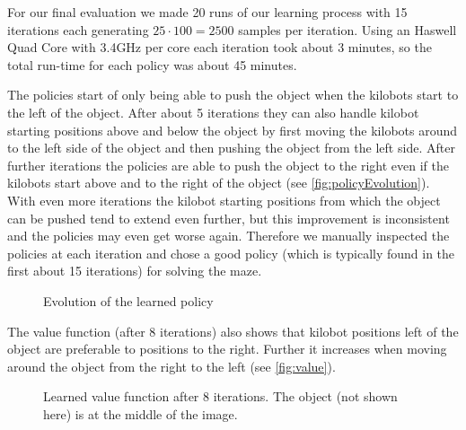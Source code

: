 \documentclass[twoside]{article}
\begin{document}
For our final evaluation we made 20 runs of our learning process with 15
iterations each generating $25 \cdot 100 = 2500$ samples per iteration. Using
an Haswell Quad Core with 3.4GHz per core each iteration took about 3 minutes,
so the total run-time for each policy was about 45 minutes.

The policies start of only being able to push the object when the kilobots start
to the left of the object. After about 5 iterations they can also handle kilobot
starting positions above and below the object by first moving the kilobots
around to the left side of the object and then pushing the object from the left
side. After further iterations the policies are able to push the object to the
right even if the kilobots start above and to the right of the object (see
\autoref{fig:policyEvolution}). With even more iterations the kilobot starting
positions from which the object can be pushed tend to extend even further, but
this improvement is inconsistent and the policies may even get worse again.
Therefore we manually inspected the policies at each iteration and chose a good
policy (which is typically found in the first about 15 iterations) for solving
the maze.

\begin{figure}[!htb]
	\centering
    \hfill
    \hfill
    \hfill
    \hfill
	\caption[foo]{Evolution of the learned policy}
	\label{fig:policyEvolution}
\end{figure}

The value function (after 8 iterations) also shows that kilobot positions left
of the object are preferable to positions to the right. Further it increases
when moving around the object from the right to the left (see \autoref{fig:value}).

\begin{figure}[!htb]
	\centering
    \def\svgwidth{\columnwidth}
    
    \caption{Learned value function after 8 iterations. The object (not shown
             here) is at the middle of the image.}
	\label{fig:value}
\end{figure}
\end{document}
